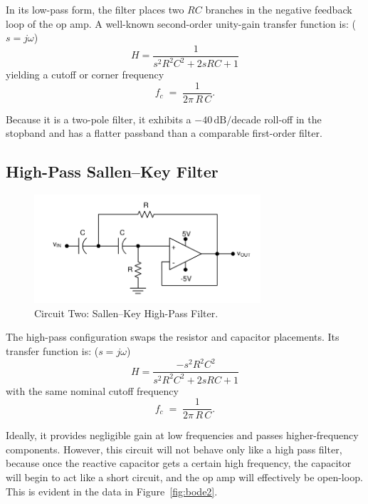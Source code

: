 \documentclass[12pt]{article}
\begin{document}
In its low-pass form, the filter places two $RC$ branches in the negative
feedback loop of the op amp. A well-known second-order unity-gain transfer
function is: ($s = j\omega$)
\begin{equation*}
	H = \frac{1}{s^2R^2C^2 + 2sRC + 1}
\end{equation*}
yielding a cutoff or corner frequency
\begin{equation*}
	f_c \;=\; \frac{1}{2\pi\,R\,C}.
\end{equation*}

Because it is a two-pole filter, it exhibits a $-40\,\mathrm{dB/decade}$ roll-off in the
stopband and has a flatter passband than a comparable first-order filter.

\subsection{High-Pass Sallen--Key Filter}

\begin{figure}[H]
	\centering
	\includegraphics[width=0.75\textwidth]{07_highpass}
	\caption{Circuit Two: Sallen--Key High-Pass Filter.}
	\label{fig:highpass}
\end{figure}

The high-pass configuration swaps the resistor and capacitor placements. Its
transfer function is: ($s = j\omega$)
\begin{equation*}
	H = \frac{-s^2R^2C^2}{s^2R^2C^2 + 2sRC + 1}
\end{equation*}
with the same nominal cutoff frequency
\begin{equation*}
	f_c \;=\; \frac{1}{2\pi\,R\,C}.
\end{equation*}

Ideally, it provides negligible gain at low frequencies and passes
higher-frequency components. However, this circuit will not behave only like a
high pass filter, because once the reactive capacitor gets a certain high
frequency, the capacitor will begin to act like a short circuit, and the op amp
will effectively be open-loop. This is evident in the data in
Figure~\ref{fig:bode2}.
\end{document}
